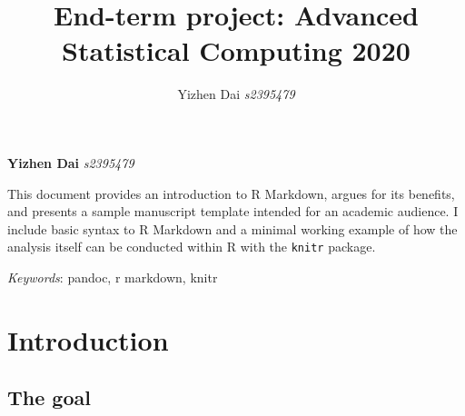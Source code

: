\documentclass[11pt,]{article}
\title{End-term project: Advanced Statistical Computing 2020  }
\author{\Large Yizhen Dai\vspace{0.05in} \newline\normalsize\emph{s2395479}  }
\date{}
\newcommand*{\authorfont}{\fontfamily{phv}\selectfont}
\renewenvironment{abstract}
 {{%
    \setlength{\leftmargin}{0mm}
    \setlength{\rightmargin}{\leftmargin}%
  }%
  \relax}
 {\endlist}
\begin{document}
	
%

{%
\setlength{\parindent}{0pt}
\thispagestyle{plain}
{\fontsize{18}{20}\selectfont\raggedright 
\maketitle  %

}

{
   \vskip 13.5pt\relax \normalsize\fontsize{11}{12} 
\textbf{\authorfont Yizhen Dai} \hskip 15pt \emph{\small s2395479}   

}

}








\begin{abstract}

    \hbox{\vrule height .2pt width 39.14pc}

    \vskip 8.5pt %

\noindent This document provides an introduction to R Markdown, argues for its
benefits, and presents a sample manuscript template intended for an
academic audience. I include basic syntax to R Markdown and a minimal
working example of how the analysis itself can be conducted within R
with the \texttt{knitr} package.


\vskip 8.5pt \noindent \emph{Keywords}: pandoc, r markdown, knitr \par

    \hbox{\vrule height .2pt width 39.14pc}



\end{abstract}


\vskip -8.5pt



\noindent  

\hypertarget{introduction}{%
\section{Introduction}\label{introduction}}

\hypertarget{the-goal}{%
\subsection{The goal}\label{the-goal}}
\end{document}
